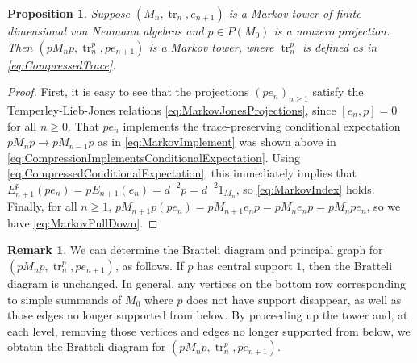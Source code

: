 \documentclass[11pt]{article}
\theoremstyle{plain}
\newtheorem{prop}[thm]{Proposition}
\theoremstyle{definition}
\newtheorem{remark}[thm]{Remark}
\DeclareMathOperator{\tr}{tr}
\begin{document}
\begin{prop}
Suppose $(M_n,\tr_n, e_{n+1})$ is a Markov tower of finite dimensional von Neumann algebras and $p\in P(M_0)$ is a nonzero projection.
Then $(pM_np, \tr_n^p, pe_{n+1})$ is a Markov tower, where $\tr_n^p$ is defined as in \eqref{eq:CompressedTrace}.
\end{prop}
\begin{proof}
First, it is easy to see that the projections $(pe_n)_{n\geq 1}$ satisfy the Temperley-Lieb-Jones relations \ref{eq:MarkovJonesProjections}, since $[e_n,p]=0$ for all $n\geq 0$.
That $pe_n$ implements the trace-preserving conditional expectation $pM_np \to pM_{n-1}p$ as in \ref{eq:MarkovImplement} was shown above in \eqref{eq:CompressionImplementsConditionalExpectation}.
Using \eqref{eq:CompressedConditionalExpectation}, this immediately implies that $E_{n+1}^p(pe_n) = pE_{n+1}(e_n) = d^{-2}p = d^{-2} 1_{M_n}$, so \ref{eq:MarkovIndex} holds.
Finally, for all $n\geq 1$, $pM_{n+1}p (pe_n) = pM_{n+1}e_np = pM_ne_np = pM_npe_n$, so we have \ref{eq:MarkovPullDown}.
\end{proof}

\begin{remark}
 \label{Rem:CompressionTowerEffects}
We can determine the Bratteli diagram and principal graph for $(pM_np, \tr_n^p, pe_{n+1})$, as follows. 
If $p$ has central support $1$, then the Bratteli diagram is unchanged. 
In general, any vertices on the bottom row corresponding to simple summands of $M_0$ where $p$ does not have support disappear, as well as those edges no longer supported from below. 
By proceeding up the tower and, at each level, removing those vertices and edges no longer supported from below, we obtatin the Bratteli diagram for $(pM_np, \tr_n^p, pe_{n+1})$.
\end{remark}
\end{document}
